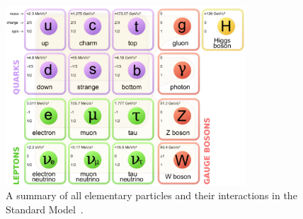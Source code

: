 \begin{figure}[hbtp]
 \begin{center}
   \includegraphics[width=0.8\textwidth]{ch2_figs/sm_particles_periodic_table.pdf}
   \caption[Particle content of the SM]{A summary of all elementary particles and their interactions in the Standard Model~\cite{sm_table}.}
   \label{fig:sm_periodic_table}
 \end{center}
\end{figure}

